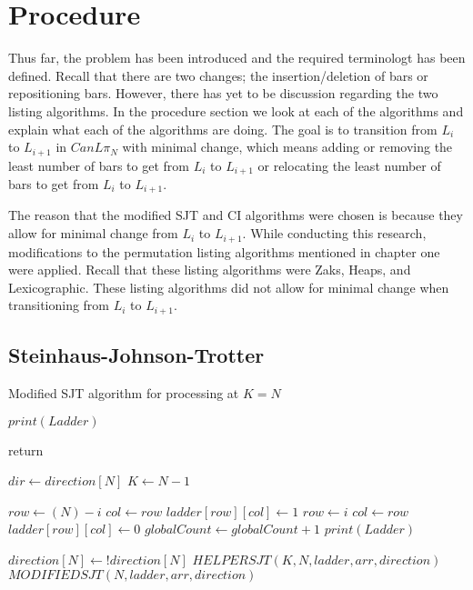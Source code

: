 \section{Procedure}

Thus far, the problem has been introduced and the required terminologt has been defined. Recall that there are two 
changes; the insertion/deletion of bars or repositioning bars.
However, there has yet to be discussion regarding the two 
listing algorithms. In the procedure section 
we look at each of the algorithms and explain what 
each of the algorithms are doing. The goal is to transition from 
$L_{i}$ to $L_{i+1}$ in $CanL{\pi_{N}}$ with minimal change, which means adding or removing 
the least number of bars to get from $L_{i}$ to $L_{i+1}$ or relocating 
the least number of bars to get from $L_{i}$ to $L_{i+1}$.\par 

The reason that the modified SJT and CI algorithms were chosen is because they allow 
for minimal change from $L_{i}$ to $L_{i+1}$. While conducting this research, modifications 
to the permutation listing algorithms mentioned in chapter one were applied. Recall that 
these listing algorithms were Zaks, Heaps, and Lexicographic. These listing algorithms 
did not allow for minimal change when transitioning from $L_{i}$ to $L_{i+1}$.
\subsection{Steinhaus-Johnson-Trotter}
\begin{algorithm}
  \caption{Modified SJT algorithm for processing at $K=N$}
  \begin{algorithmic}[1]


      \State $print(Ladder)$

        \State return
      \EndIf

     
      \State $dir \gets direction[N]$
      \State $K \gets N-1$
        
            \State $row \gets (N) - i$
            \State $col \gets row$
            \State $ladder[row][col] \gets 1$
        \Else
            \State $row \gets i$
            \State $col \gets row$
            \State $ladder[row][col] \gets 0$
        \EndIf
        \State $globalCount \gets globalCount+1$
        \State $print(Ladder)$

      \EndFor
      \State $direction[N] \gets !direction[N]$
      \State $HELPERSJT(K, N, ladder, arr, direction)$
      \State $MODIFIEDSJT(N,  ladder, arr, direction)$

    \EndFunction
  \end{algorithmic}
\end{algorithm}

